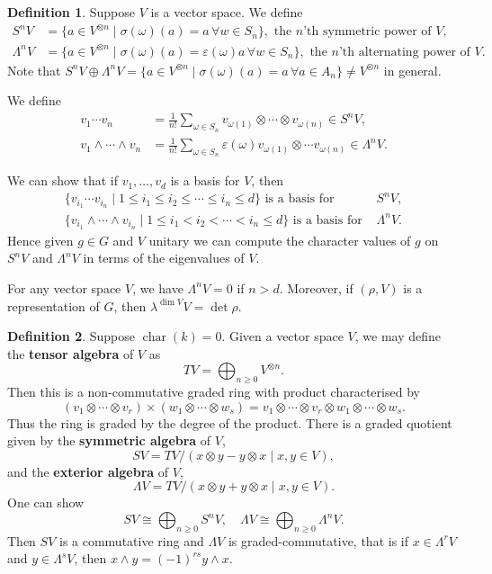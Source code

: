 \documentclass[12pt]{article}
\DeclareMathOperator{\chr}{char}
\theoremstyle{definition}
\newtheorem{definition}{Definition}[section]
\theoremstyle{remark}
\begin{document}
\begin{definition}
	Suppose $V$ is a vector space. We define
	\begin{align*}
		S^{n}V &= \{a \in V^{\otimes n} \mid \sigma(\omega)(a) = a \, \forall w \in S_n\}, \text{ the $n$'th symmetric power of } V,\\
		\Lambda^{n}V &= \{a \in V^{\otimes n} \mid \sigma(\omega)(a) = \varepsilon(\omega) a \, \forall w \in S_n\}, \text{ the $n$'th alternating power of }V.
	\end{align*}
	Note that $S^{n}V \oplus \Lambda^{n}V = \{a \in V^{\otimes n} \mid \sigma(\omega)(a) = a \, \forall a \in A_n\} \neq V^{\otimes n}$ in general.

	We define
	\begin{align*}
		v_1\cdots v_n &= \frac{1}{n!} \sum_{\omega \in S_n} v_{\omega(1)} \otimes \cdots \otimes v_{\omega(n)} \in S^{n}V, \\
		v_1 \wedge \cdots \wedge v_n &= \frac{1}{n!} \sum_{\omega \in S_n} \varepsilon(\omega) v_{\omega(1)} \otimes \cdots v_{\omega(n)} \in \Lambda^{n}V.
	\end{align*}
\end{definition}

We can show that if $v_1, \ldots, v_d$ is a basis for $V$, then
\begin{align*}
	\{v_{i_1} \cdots v_{i_n} \mid 1 \leq i_1 \leq i_2 \leq \cdots \leq i_n \leq d\} \text{ is a basis for } &S^{n}V, \\
	\{v_{i_1} \wedge \cdots \wedge v_{i_n} \mid 1 \leq i_1 < i_2 < \cdots < i_n \leq d\} \text{ is a basis for } & \Lambda^{n}V.
\end{align*}
Hence given $g \in G$ and $V$ unitary we can compute the character values of $g$ on $S^{n}V$ and $\Lambda^{n}V$ in terms of the eigenvalues of $V$.

For any vector space $V$, we have $\Lambda^{n}V = 0$ if $n > d$. Moreover, if $(\rho, V)$ is a representation of $G$, then $\lambda^{\dim V}V = \det \rho$.

\begin{definition}
	Suppose $\chr(k) = 0$. Given a vector space $V$, we may define the \textbf{tensor algebra} of $V$ as
	\[
	TV = \bigoplus_{n \geq 0} V^{\otimes n}
	.\]
	Then this is a non-commutative graded ring with product characterised by
	\[
		(v_1 \otimes \cdots \otimes v_r) \times (w_1 \otimes \cdots \otimes w_s) = v_1 \otimes \cdots \otimes v_r \otimes w_1 \otimes \cdots \otimes w_s
	.\]
	Thus the ring is graded by the degree of the product. There is a graded quotient given by the \textbf{symmetric algebra} of $V$,
	\[
		SV =  TV/(x \otimes y - y \otimes x \mid x, y \in V)
	,\]
	and the \textbf{exterior algebra} of $V$,
	\[
		\Lambda V = TV/(x \otimes y + y \otimes x \mid x, y \in V)
	.\]
	One can show
	\[
	SV \cong  \bigoplus_{n \geq 0} S^{n}V, \quad \Lambda V \cong \bigoplus_{n \geq 0} \Lambda^{n}V
	.\]
	Then $SV$ is a commutative ring and $\Lambda V$ is graded-commutative, that is if $x \in \Lambda^{r}V$ and $y \in \Lambda^{s}V$, then $x \wedge y = (-1)^{rs}y \wedge x$.
\end{definition}
\end{document}
